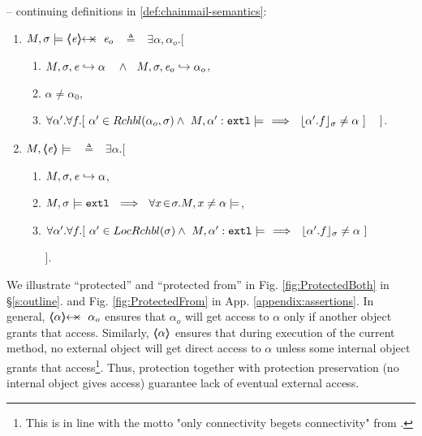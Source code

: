  
\begin{definition} 
\label{def:chainmail-protection-from}
\label{sect:semantics:assert:prtFrom}
 \label{def:chainmail-protection}
-- continuing definitions in \ref{def:chainmail-semantics}:
\begin{enumerate}
 \item
 \label{cProtected}
$\satisfiesA{M}{\sigma} {\protectedFrom \re  {\re_o}}$ $\ \  \triangleq\ \ $ 
$\exists \alpha, \alpha_{o}. [$ 
  \begin{enumerate}
 \item
 $ \eval{M}{\sigma}{{\re}}{\alpha}\ \ \ \wedge\ \ \eval{M}{\sigma}{{\re_o}}{\alpha_o}$,
  \item
$\alpha\neq \alpha_0$,
 \item
$\forall \alpha'.\forall f.[\ \alpha' \in {\ensuremath{Rchbl(\alpha_o,\sigma)}} \wedge\   M , \alpha':\mbox{\normalfont{\texttt{extl}}} \models \ \ \Longrightarrow \ \  
  \lfloor \alpha'.f \rfloor_{\sigma} \neq \alpha     \ ] $  $  \strut \hspace{.25cm} ] $.
\end{enumerate}

\item
 \label{sect:semantics:assert:prt}
$\satisfiesA{M} {\inside \re} $ $\ \  \triangleq\ \  $ 
$\exists \alpha. [$  
\begin{enumerate}
\item
$ M, \sigma, {\mathit{e}} \hookrightarrow \alpha$,
 \item 
 $\satisfiesA {M}{\sigma}{\extThis}\ \ \Longrightarrow\ \ \forall x\!\in\! \sigma.\satisfiesA{M}{x\neq \alpha}$,
 \item
$\forall \alpha'.\forall f.[\ \alpha' \in {\ensuremath{LocRchbl(\sigma)}} \wedge\   M , \alpha':\mbox{\normalfont{\texttt{extl}}} \models \ \ \Longrightarrow \ \  
  \lfloor \alpha'.f \rfloor_{\sigma} \neq \alpha     \ ]$ 
 \strut \hspace{.25cm} ].   
  \end{enumerate} 
    \end{enumerate} 
 \end{definition} 
 
 We illustrate ``protected'' and ``protected from'' in Fig.  \ref{fig:ProtectedBoth} in \S \ref{s:outline}.
   and    Fig.  \ref{fig:ProtectedFrom} in App. \ref{appendix:assertions}.
%
In general,  $\protectedFrom{{\alpha}} {{\alpha_{o}}}$ ensures that $\alpha_o$ will get access to $\alpha$ only if another object 
 grants that access.
Similarly, $\langle\!\!\langle \alpha \rangle\!\!\rangle$ ensures that during execution of the current method, no external object will get direct access to $\alpha$ unless some internal object grants that access\footnote{This is in line with the motto "only connectivity begets connectivity" from \cite{MillerPhD}.}.
Thus, protection together with protection preservation  (\ie no internal object gives access) guarantee
lack of eventual external access.  

